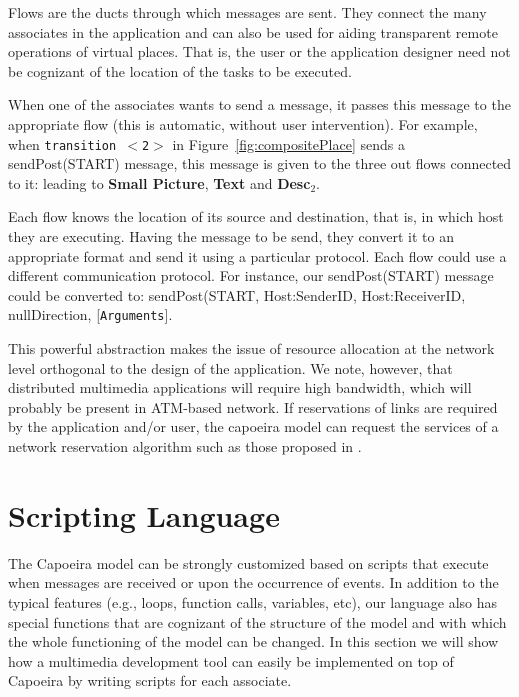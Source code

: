 \documentclass[twocolumn,10pt]{article}
\newcommand{\startRep}{START}
\newcommand{\trans}[1]{{\tt transition $<$#1$>$}}
\newcommand{\elmt}[1]{{\bf #1}}
\begin{document}
Flows are the ducts through which messages are sent.  They connect the
many associates in the application and can also be used for aiding
transparent remote operations of virtual places.  That is, the user or the application
designer need not be cognizant of the location of the tasks to be
executed.

When one of the associates wants to send a message, it passes this
message to the appropriate flow (this is automatic, without user
intervention).  For example, when \trans{2} in
Figure~\ref{fig:compositePlace} sends a sendPost(\startRep) message,
this message is given to the three out flows connected to it: leading to
\elmt{Small Picture}, \elmt{Text} and \elmt{Desc$_2$}.

Each flow knows the location of its source and destination, that is,
in which host they are executing.  Having the message to be send, they
convert it to an appropriate format and send it using a particular
protocol.  Each flow could use a different communication protocol.
For instance, our sendPost(\startRep) message could be converted to:
sendPost(\startRep, Host:SenderID, Host:ReceiverID, nullDirection, [{\tt Arguments}].

This powerful abstraction makes the issue
of resource allocation at the network level orthogonal to the design
of the application.  We note, however, that distributed multimedia
applications will require high bandwidth, which will probably be
present in ATM-based network.  If reservations of links are required
by the application and/or user, the capoeira model can request the
services of a network reservation algorithm such as those proposed in
\cite{fie:vnet,fer:rtchannel}.

\section{Scripting Language}
\label{sect-scripting}

The Capoeira model can be strongly customized based on scripts that
execute when messages are received or upon the occurrence of events.  In
addition to the typical features (e.g., loops, function calls,
variables, etc), our language also has special functions that are
cognizant of the structure of the model and with which the whole
functioning of the model can be changed.  In this section we will show
how a multimedia development tool can easily be implemented on top of
Capoeira by writing scripts for each associate.
\end{document}
